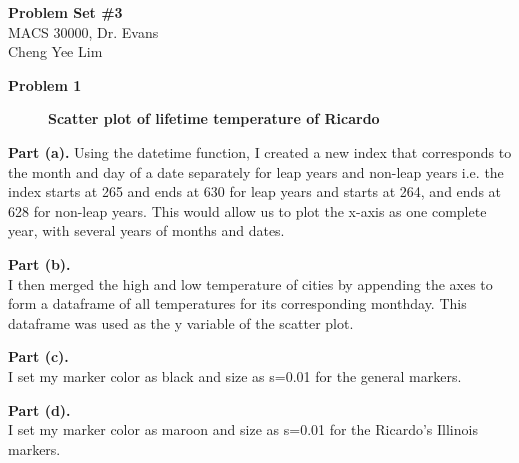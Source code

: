 \documentclass[letterpaper,12pt]{article}
\theoremstyle{definition}
\begin{document}
\begin{flushleft}
  \textbf{\large{Problem Set \#3}} \\
  MACS 30000, Dr. Evans \\
  Cheng Yee Lim
\end{flushleft}

\vspace{5mm}

\noindent\textbf{Problem 1}\\
\begin{figure}[htb]\centering\captionsetup{width=4.0in}
  \caption{\textbf{Scatter plot of lifetime temperature of Ricardo}}\label{FigExample}
\end{figure}
\flushleft
\textbf{Part (a).}
\flushleft Using the datetime function, I created a new index that corresponds to the month and day of a date separately for leap years and non-leap years i.e. the index starts at 265 and ends at 630 for leap years and starts at 264, and ends at 628 for non-leap years. This would allow us to plot the x-axis as one complete year, with several years of months and dates.
\flushleft

\textbf{Part (b).} \\
\flushleft I then merged the high and low temperature of cities by appending the axes to form a dataframe of all temperatures for its corresponding monthday. This dataframe was used as the y variable of the scatter plot. 
\flushleft

\textbf{Part (c).} \\
\flushleft I set my marker color as black and size as s=0.01 for the general markers.
\flushleft

\textbf{Part (d).} \\
\flushleft I set my marker color as maroon and size as s=0.01 for the Ricardo's Illinois markers.
\flushleft
\end{document}
